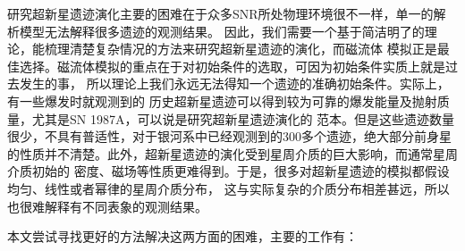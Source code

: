 研究超新星遗迹演化主要的困难在于众多SNR所处物理环境很不一样，单一的解析模型无法解释很多遗迹的观测结果。
因此，我们需要一个基于简洁明了的理论，能梳理清楚复杂情况的方法来研究超新星遗迹的演化，而磁流体
模拟正是最佳选择。磁流体模拟的重点在于对初始条件的选取，可因为初始条件实质上就是过去发生的事，
所以理论上我们永远无法得知一个遗迹的准确初始条件。实际上，有一些爆发时就观测到的
历史超新星遗迹可以得到较为可靠的爆发能量及抛射质量，尤其是SN 1987A，可以说是研究超新星遗迹演化的
范本。但是这些遗迹数量很少，不具有普适性，对于银河系中已经观测到的300多个遗迹，绝大部分前身星
的性质并不清楚。此外，超新星遗迹的演化受到星周介质的巨大影响，而通常星周介质初始的
密度、磁场等性质更难得到。于是，很多对超新星遗迹的模拟都假设均匀、线性或者幂律的星周介质分布，
这与实际复杂的介质分布相差甚远，所以也很难解释有不同表象的观测结果。

本文尝试寻找更好的方法解决这两方面的困难，主要的工作有：
